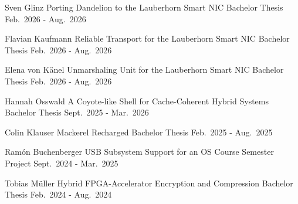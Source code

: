 
\begin{cventries}
    \cventry
    {Sven Glinz}
    {Porting Dandelion to the Lauberhorn Smart NIC}
    {Bachelor Thesis}
    {Feb.\ 2026 - Aug.\ 2026}
    {}

    \cventry
    {Flavian Kaufmann}
    {Reliable Transport for the Lauberhorn Smart NIC}
    {Bachelor Thesis}
    {Feb.\ 2026 - Aug.\ 2026}
    {}

    \cventry
    {Elena von K\"anel}
    {Unmarshaling Unit for the Lauberhorn Smart NIC}
    {Bachelor Thesis}
    {Feb.\ 2026 - Aug.\ 2026}
    {}

    \cventry
    {Hannah Osswald}
    {A Coyote-like Shell for Cache-Coherent Hybrid Systems}
    {Bachelor Thesis}
    {Sept.\ 2025 - Mar.\ 2026}
    {}

    \cventry
    {Colin Klauser}
    {Mackerel Recharged}
    {Bachelor Thesis}
    {Feb.\ 2025 - Aug.\ 2025}
    {}

    \cventry
    {Ram\'on Buchenberger}
    {USB Subsystem Support for an OS Course}
    {Semester Project}
    {Sept.\ 2024 - Mar.\ 2025}
    {}

    \cventry
    {Tobias M\"uller}
    {Hybrid FPGA-Accelerator Encryption and Compression}
    {Bachelor Thesis}
    {Feb.\ 2024 - Aug.\ 2024}
    {}
\end{cventries}
